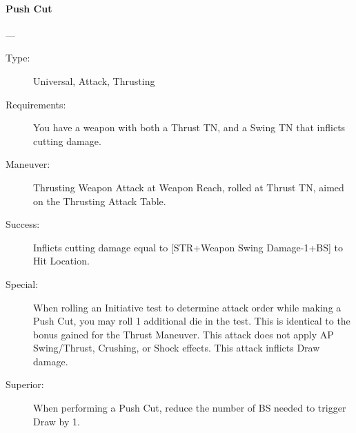 \documentclass[oneside,11pt,english]{book}
\begin{document}
\paragraph{\large\label{man:Push Cut}Push Cut}---\quad{\large[X+1]}
\vspace{-10pt}\begin{description} 
\item [Type:] Universal, Attack, Thrusting 
\item [Requirements:] You have a weapon with both a Thrust TN, and a Swing TN that inflicts cutting damage. 
\item [Maneuver:] Thrusting Weapon Attack at Weapon Reach, rolled at Thrust TN, aimed on the Thrusting 
Attack Table.
\item [Success:] Inflicts cutting damage equal to [STR+Weapon Swing Damage-1+BS] to Hit Location. 
\item [Special:] When rolling an Initiative test to determine attack order while making a Push Cut, you may roll 1 
additional die in the test. This is identical to the bonus gained for the Thrust Maneuver. 
This attack does not apply AP Swing/Thrust, Crushing, or Shock effects. 
This attack inflicts Draw damage. 
\item [Superior:] When performing a Push Cut, reduce the number of BS needed to trigger Draw by 1.
\end{description}
\end{document}

